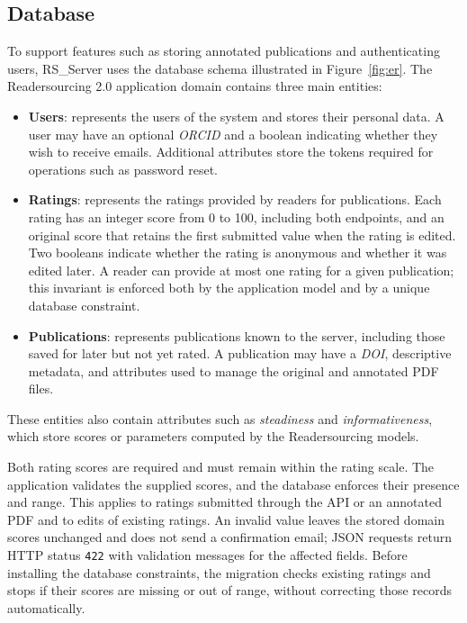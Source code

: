 \documentclass[a4paper, english]{article}
\newcommand{\rsserver}{RS\_Server\xspace}
\begin{document}
\subsection{Database}

To support features such as storing annotated publications and authenticating users, \rsserver uses the database schema illustrated in Figure~\ref{fig:er}. The Readersourcing 2.0 application domain contains three main entities:

\begin{itemize}
\item \textbf{Users}: represents the users of the system and stores their personal data. A user may have an optional \emph{ORCID} and a boolean indicating whether they wish to receive emails. Additional attributes store the tokens required for operations such as password reset.
\item \textbf{Ratings}: represents the ratings provided by readers for publications. Each rating has an integer score from 0 to 100, including both endpoints, and an original score that retains the first submitted value when the rating is edited. Two booleans indicate whether the rating is anonymous and whether it was edited later. A reader can provide at most one rating for a given publication; this invariant is enforced both by the application model and by a unique database constraint.
\item \textbf{Publications}: represents publications known to the server, including those saved for later but not yet rated. A publication may have a \emph{DOI}, descriptive metadata, and attributes used to manage the original and annotated PDF files.
\end{itemize}
These entities also contain attributes such as \emph{steadiness} and \emph{informativeness}, which store scores or parameters computed by the Readersourcing models.

Both rating scores are required and must remain within the rating scale. The application validates the supplied scores, and the database enforces their presence and range. This applies to ratings submitted through the API or an annotated PDF and to edits of existing ratings. An invalid value leaves the stored domain scores unchanged and does not send a confirmation email; JSON requests return HTTP status \verb|422| with validation messages for the affected fields. Before installing the database constraints, the migration checks existing ratings and stops if their scores are missing or out of range, without correcting those records automatically.
\end{document}
